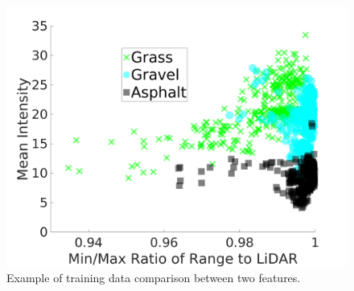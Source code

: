 \documentclass[journal,onecolumn]{IEEEtran}
\begin{document}

			\begin{figure}[H]
			\centering
			\includegraphics[width=0.75\linewidth]{figures/training_data_cluster_5}
			\caption[Example Clustering]{Example of training data comparison between two features.}
			\label{fig:training_data_cluster_2}
			\end{figure}
\end{document}
